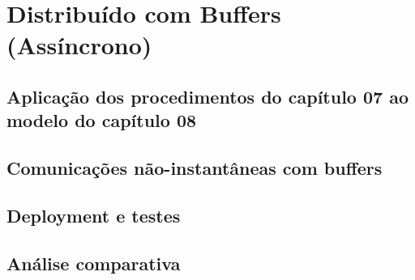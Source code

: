 \section{Distribuído com Buffers (Assíncrono)}

\subsection{Aplicação dos procedimentos do capítulo 07 ao modelo do capítulo 08}

\subsection{Comunicações não-instantâneas com buffers}

\subsection{Deployment e testes}

\subsection{Análise comparativa}

